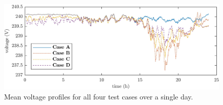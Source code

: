 \begin{figure}\centering
	\includegraphics{_chapter4/fig/voltage-profiles}
	\caption{Mean voltage profiles for all four test cases over a single day.}
	\label{ch4:fig:voltage-profiles}
\end{figure}
